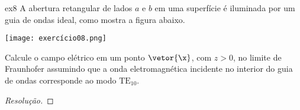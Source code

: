 \begin{exercício}{}{ex8}
    A abertura retangular de lados \(a\) e \(b\) em uma superfície é iluminada por um guia de ondas ideal, como mostra a figura abaixo. 
    \begin{center}
        \texttt{[image: exercício08.png]}
    \end{center}
    Calcule o campo elétrico em um ponto \(\vetor{\x}\), com \(z > 0\), no limite de Fraunhofer assumindo que a onda eletromagnética incidente no interior do guia de ondas corresponde ao modo \(\mathrm{TE}_{10}.\)
\end{exercício}
\begin{proof}[Resolução]
    
\end{proof}
